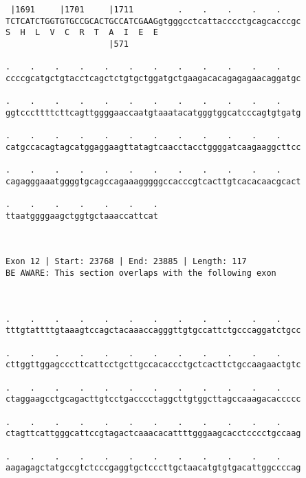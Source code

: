 \documentclass{article}
\begin{document}
\begin{Verbatim}
 |1691     |1701     |1711         .    .    .    .    .    
TCTCATCTGGTGTGCCGCACTGCCATCGAAGgtgggcctcattacccctgcagcacccgc
S  H  L  V  C  R  T  A  I  E  E                             
                     |571                                   
  
.    .    .    .    .    .    .    .    .    .    .    .    
ccccgcatgctgtacctcagctctgtgctggatgctgaagacacagagagaacaggatgc
                                                            
.    .    .    .    .    .    .    .    .    .    .    .    
ggtcccttttcttcagttggggaaccaatgtaaatacatgggtggcatcccagtgtgatg
                                                            
.    .    .    .    .    .    .    .    .    .    .    .    
catgccacagtagcatggaggaagttatagtcaacctacctggggatcaagaaggcttcc
                                                            
.    .    .    .    .    .    .    .    .    .    .    .    
cagagggaaatggggtgcagccagaaagggggccacccgtcacttgtcacacaacgcact
                                                            
.    .    .    .    .    .    .
ttaatggggaagctggtgctaaaccattcat
                               
                               
 
Exon 12 | Start: 23768 | End: 23885 | Length: 117
BE AWARE: This section overlaps with the following exon



.    .    .    .    .    .    .    .    .    .    .    .    
tttgtattttgtaaagtccagctacaaaccagggttgtgccattctgcccaggatctgcc
                                                            
.    .    .    .    .    .    .    .    .    .    .    .    
cttggttggagcccttcattcctgcttgccacaccctgctcacttctgccaagaactgtc
                                                            
.    .    .    .    .    .    .    .    .    .    .    .    
ctaggaagcctgcagacttgtcctgacccctaggcttgtggcttagccaaagacaccccc
                                                            
.    .    .    .    .    .    .    .    .    .    .    .    
ctagttcattgggcattccgtagactcaaacacattttgggaagcacctcccctgccaag
                                                            
.    .    .    .    .    .    .    .    .    .    .    .    
aagagagctatgccgtctcccgaggtgctcccttgctaacatgtgtgacattggccccag
                                                            

\end{Verbatim}
\end{document}
